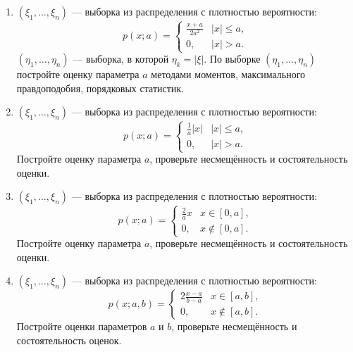 \documentclass[a4paper,12pt]{article}
\newcommand{\modulus}[1]{\left | #1 \right |}
\newcommand{\sample}[2]{\left( #1_1, \dots, #1_{#2} \right)}
\begin{document}
\begin{enumerate}[resume, topsep=1cm, parsep=1cm]
        \item $\sample{\xi}{n}$ --- выборка из распределения с плотностью вероятности:
              \[
                  p(x; a)
                  = \left \{
                  \begin{array}{ll}
                      \frac{x+a}{2 a^2} & \modulus{x} \le a , \\
                      0,                & \modulus{x} > a .
                  \end{array}
                  \right .
              \]
              $\sample{\eta}{n}$ --- выборка, в которой $\eta_k = \modulus{\xi}$. По выборке $\sample{\eta}{n}$ постройте оценку параметра $a$ методами
              моментов, максимального правдоподобия, порядковых статистик.

        \item $\sample{\xi}{n}$ --- выборка из распределения с плотностью вероятности:
              \[
                  p(x; a)
                  = \left \{
                  \begin{array}{ll}
                      \frac{1}{a} \modulus{x} & \modulus{x} \le a , \\
                      0,                      & \modulus{x} > a .
                  \end{array}
                  \right .
              \]
              Постройте оценку параметра $a$, проверьте несмещённость и состоятельность оценки.

        \item $\sample{\xi}{n}$ --- выборка из распределения с плотностью вероятности:
              \[
                  p(x; a)
                  = \left \{
                  \begin{array}{ll}
                      \frac{2}{a} x & x \in [0, a],     \\
                      0,            & x \notin [0, a] .
                  \end{array}
                  \right .
              \]
              Постройте оценку параметра $a$, проверьте несмещённость и состоятельность оценки.

        \item $\sample{\xi}{n}$ --- выборка из распределения с плотностью вероятности:
              \[
                  p(x; a, b)
                  = \left \{
                  \begin{array}{ll}
                      2 \frac{x-a}{b-a} & x \in [a, b],     \\
                      0,                & x \notin [a, b] .
                  \end{array}
                  \right .
              \]
              Постройте оценки параметров $a$ и $b$, проверьте несмещённость и состоятельность оценок.


\end{enumerate}
\end{document}
